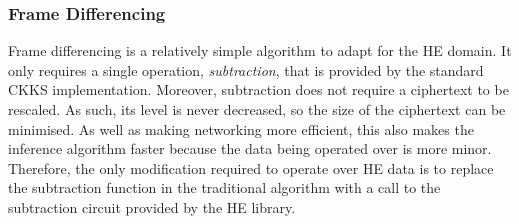 \setlength{\leftskip}{0cm}
\subsubsection{Frame Differencing}
\setlength{\leftskip}{0.5cm}
\indent \indent
Frame differencing is a relatively simple algorithm to adapt for the HE domain. It only requires a single operation, \textit{subtraction}, that is provided by the standard CKKS implementation. Moreover, subtraction does not require a ciphertext to be rescaled. As such, its level is never decreased, so the size of the ciphertext can be minimised. As well as making networking more efficient, this also makes the inference algorithm faster because the data being operated over is more minor.
\smallskip \\ \indent
Therefore, the only modification required to operate over HE data is to replace the subtraction function in the traditional algorithm with a call to the subtraction circuit provided by the HE library.


\setlength{\leftskip}{0cm}
